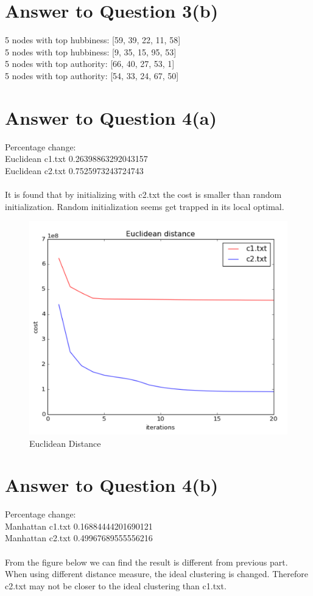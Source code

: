 \documentclass[11pt]{article}
\begin{document}
\pagebreak[4]
\section*{Answer to Question 3(b)}
5 nodes with top hubbiness: [59, 39, 22, 11, 58]\\
5 nodes with top hubbiness: [9, 35, 15, 95, 53]\\
5 nodes with top authority: [66, 40, 27, 53, 1]\\
5 nodes with top authority: [54, 33, 24, 67, 50]

\pagebreak[4]
\section*{Answer to Question 4(a)}
Percentage change:\\
Euclidean c1.txt 0.26398863292043157\\
Euclidean c2.txt 0.7525973243724743\\
\\
It is found that by initializing with c2.txt the cost is smaller than random initialization.
Random initialization seems get trapped in its local optimal.

\begin{figure}[h]
\center
\includegraphics[scale=0.7]{Euclidean.png}
\caption{Euclidean Distance}
\end{figure}


\pagebreak[4]
\section*{Answer to Question 4(b)}
Percentage change:\\
Manhattan c1.txt 0.16884444201690121\\
Manhattan c2.txt 0.49967689555556216\\
\\
From the figure below we can find the result is different from previous part.
When using different distance measure, the ideal clustering is changed. Therefore c2.txt may not be closer to the ideal clustering than c1.txt.
\end{document}
